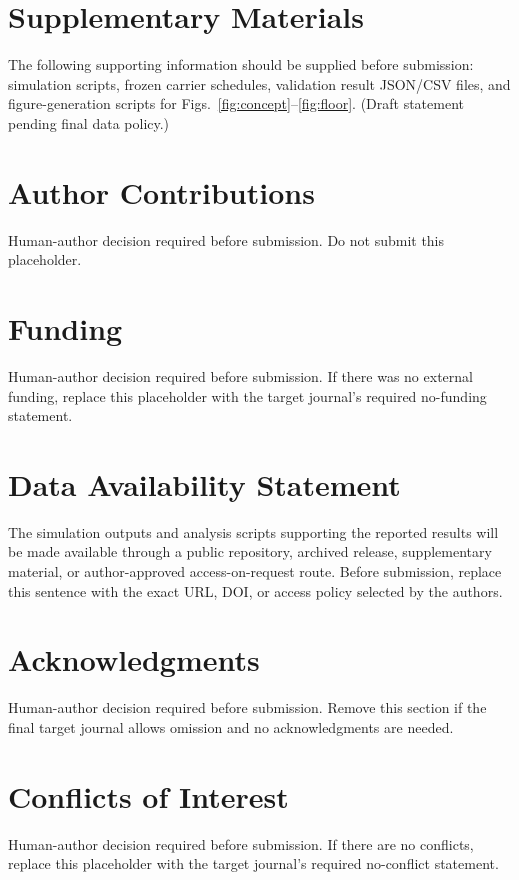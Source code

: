 \documentclass[journal]{IEEEtran}
\begin{document}
\section*{Supplementary Materials}
The following supporting information should be supplied before submission: simulation scripts,
frozen carrier schedules, validation result JSON/CSV files, and figure-generation scripts for
Figs.~\ref{fig:concept}--\ref{fig:floor}. (Draft statement pending final data policy.)

\section*{Author Contributions}
Human-author decision required before submission. Do not submit this placeholder.

\section*{Funding}
Human-author decision required before submission. If there was no external funding, replace this
placeholder with the target journal's required no-funding statement.

\section*{Data Availability Statement}
The simulation outputs and analysis scripts supporting the reported results will be made available
through a public repository, archived release, supplementary material, or author-approved
access-on-request route. Before submission, replace this sentence with the exact URL, DOI, or
access policy selected by the authors.

\section*{Acknowledgments}
Human-author decision required before submission. Remove this section if the final target journal
allows omission and no acknowledgments are needed.

\section*{Conflicts of Interest}
Human-author decision required before submission. If there are no conflicts, replace this
placeholder with the target journal's required no-conflict statement.



\end{document}

